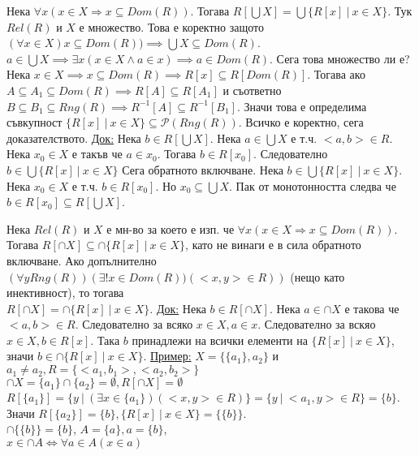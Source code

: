 \documentclass[fleqn, titlepage, 12pt]{report}
\begin{document}
 Нека $\forall{x}(x \in X \Rightarrow x \subseteq Dom(R))$. Тогава $R[\bigcup X] = \bigcup \{R[x]\ |\ x \in X\}$.
Тук $Rel(R)$ и $X$ е множество.
Това е коректно защото $(\forall{x \in X})x \subseteq Dom(R)) \implies \bigcup X \subseteq Dom(R)$.
$a \in \bigcup X \implies \exists{x}(x \in X \land  a \in x) \implies a \in Dom(R)$. Сега това множество ли е?\\
Нека $x \in X \implies x \subseteq Dom(R) \implies R[x] \subseteq R[Dom(R)]$.
Тогава ако $A \subseteq A_1 \subseteq Dom(R) \implies R[A] \subseteq R[A_1]$ и съответно
$B \subseteq B_1 \subseteq Rng(R) \implies R^{-1}[A] \subseteq R^{-1}[B_1]$.
Значи това е определима съвкупност $ \{R[x]\ |\ x \in X\} \subseteq \mathcal{P}(Rng(R))$.
Всичко е коректно, сега доказателството.
\bigbreak
\underline{Док:} Нека $b \in R[\bigcup X]$. Нека $a \in \bigcup X$ е т.ч. $<a,b> \in R$. Нека $x_0 \in X$ е такъв че $a \in x_0$.
Тогава $b \in R[x_0]$. Следователно $b \in \bigcup \{R[x]\ |\ x \in X\}$
\bigbreak
Сега обратното включване. Нека $b \in \bigcup \{R[x]\ |\ x \in X\}$. Нека $x_0 \in X$ е т.ч. $b \in R[x_0]$.
Но $x_0 \subseteq \bigcup X$. Пак от монотонността следва че $b \in R[x_0] \subseteq R[\bigcup X]$.
\bigbreak

 Нека $Rel(R)$ и $X$ е мн-во за което е изп. че $\forall{x}(x \in X \Rightarrow x \subseteq Dom(R))$.
Тогава $R[\cap X] \subseteq \cap \{R[x]\ |\ x \in X\}$, като не винаги е в сила обратното включване.
Ако допълнително $(\forall{y}Rng(R))(\exists{!x \in Dom(R))(<x,y> \in R)})$ (нещо като инективност), то тогава \\
$R[\cap X] = \cap \{R[x]\ |\ x \in X\}$.
\bigbreak
\underline{Док:} Нека $b \in R[\cap X]$. Нека $a \in \cap X $ е такова че $<a,b> \in R$.
Следователно за всяко $x \in X, a \in x$. Следователно за вскяо $x \in X, b \in R[x]$.
Така $b$ принадлежи на всички елементи на $\{R[x]\ |\ x \in X\}$, значи $b \in \cap \{R[x]\ |\ x \in X\}$.
\bigbreak
\underline{Пример:} $X = \{ \{ a_1\}, {a_2}\}$ и $a_1 \neq a_2, R = \{<a_1, b_1>, <a_2, b_2> \}$\\
$\cap X = \{a_1\} \cap \{ a_2\} = \emptyset, R[\cap X] = \emptyset$\\
$R[ \{ a_1\} ] = \{y\ |\ (\exists{x \in \{ a_1\}})(<x,y> \in R)\} = \{y\ |\ <a_1,y> \in R\} = \{ b\}$.\\
Значи $R[ \{ a_2\}] = \{ b\}, \{R[x]\ |\ x \in X \} = \{ \{ b\}\}$.\\
$\cap \{ \{ b\}\} = \{ b\}$, $A = \{ a\}, a = \{ b\}$,\\
$x \in \cap A \Leftrightarrow \forall{a \in A}(x \in a)$
\end{document}
